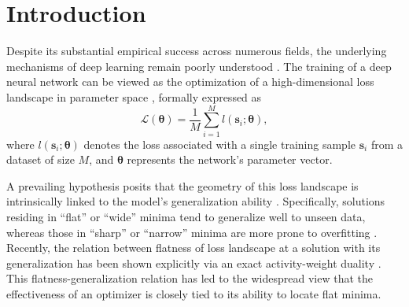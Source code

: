 \documentclass[aps,prx,reprint,superscriptaddress,longbibliography,nofootinbib,floatfix]{revtex4-2}
\begin{document}
\maketitle


\section{Introduction}
Despite its substantial empirical success across numerous fields, the underlying mechanisms of deep learning remain poorly understood \cite{lecunDeepLearning2015,levineMachineLearningMeets2024a}. The training of a deep neural network can be viewed as the optimization of a high-dimensional loss landscape in parameter space \cite{liuLossLandscapesOptimization2022,sunGlobalLandscapeNeural2020,zhangEmbeddingPrincipleHierarchical2022}, formally expressed as
\begin{equation}
\mathcal{L}(\bm{\theta})=\frac{1}{M}\sum_{i=1}^M l(\bm{s}_i; \bm{\theta}),
\end{equation}
where $l(\bm{s}_i; \bm{\theta})$ denotes the loss associated with a single training sample $\bm{s}_i$ from a dataset of size $M$, and $\bm{\theta}$ represents the network’s parameter vector.

A prevailing hypothesis posits that the geometry of this loss landscape is intrinsically linked to the model's generalization ability \cite{choromanskaLossSurfacesMultilayer2015, huangUnderstandingGeneralizationVisualizations2020}. Specifically, solutions residing in ``flat'' or ``wide'' minima tend to generalize well to unseen data, whereas those in ``sharp'' or ``narrow'' minima are more prone to overfitting \cite{hochreiterFlatMinima1997,liVisualizingLossLandscape2018,jastrzebskiThreeFactorsInfluencing2018,wuHowSGDSelects2018,keskarLargeBatchTrainingDeep2017,chenSimpleConnectionLoss2024}. Recently, the relation between flatness of loss landscape at a solution with its generalization has been shown explicitly via an exact activity-weight duality \cite{fengActivityWeightDuality2023}. This flatness-generalization relation has led to the widespread view that the effectiveness of an optimizer is closely tied to its ability to locate flat minima.
\end{document}
